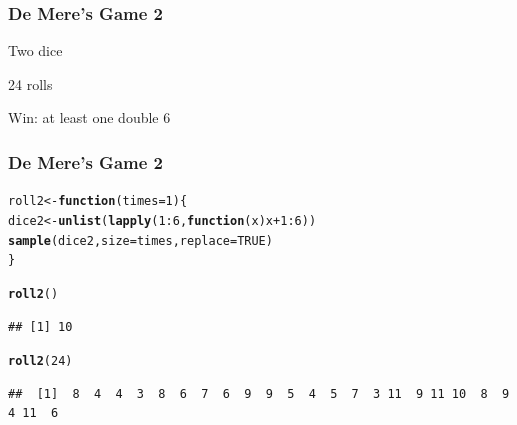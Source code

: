 \documentclass[12pt]{beamer}\usepackage[]{graphicx}\usepackage[]{color}
\makeatletter
\newcommand{\hlnum}[1]{\textcolor[rgb]{0.686,0.059,0.569}{#1}}%
\newcommand{\hlopt}[1]{\textcolor[rgb]{0,0,0}{#1}}%
\newcommand{\hlstd}[1]{\textcolor[rgb]{0.345,0.345,0.345}{#1}}%
\newcommand{\hlkwa}[1]{\textcolor[rgb]{0.161,0.373,0.58}{\textbf{#1}}}%
\newcommand{\hlkwb}[1]{\textcolor[rgb]{0.69,0.353,0.396}{#1}}%
\newcommand{\hlkwc}[1]{\textcolor[rgb]{0.333,0.667,0.333}{#1}}%
\newcommand{\hlkwd}[1]{\textcolor[rgb]{0.737,0.353,0.396}{\textbf{#1}}}%
\newenvironment{kframe}{%
 \def\at@end@of@kframe{}%
 \ifinner\ifhmode%
  \def\at@end@of@kframe{\end{minipage}}%
  \begin{minipage}{\columnwidth}%
 \fi\fi%
 \def\FrameCommand##1{\hskip\@totalleftmargin \hskip-\fboxsep
 \colorbox{shadecolor}{##1}\hskip-\fboxsep
     \hskip-\linewidth \hskip-\@totalleftmargin \hskip\columnwidth}%
 \MakeFramed {\advance\hsize-\width
   \@totalleftmargin\z@ \linewidth\hsize
   \@setminipage}}%
 {\par\unskip\endMakeFramed%
 \at@end@of@kframe}
\newenvironment{knitrout}{}{} %
\makeatother
\begin{document}

\begin{frame}
\begin{center}
\Huge{}
\end{center}
\end{frame}


\begin{frame}[fragile]
\frametitle{De Mere's Game 2}

\bi
  \item Two dice
  \item 24 rolls
  \item Win: at least one double 6
\ei
\eb

\end{frame}


\begin{frame}[fragile]
\frametitle{De Mere's Game 2}

\begin{knitrout}\footnotesize
{}\color{fgcolor}\begin{kframe}
\begin{alltt}
\hlstd{roll2} \hlkwb{<-} \hlkwa{function}\hlstd{(}\hlkwc{times} \hlstd{=} \hlnum{1}\hlstd{) \{}
  \hlstd{dice2} \hlkwb{<-} \hlkwd{unlist}\hlstd{(}\hlkwd{lapply}\hlstd{(}\hlnum{1}\hlopt{:}\hlnum{6}\hlstd{,} \hlkwa{function}\hlstd{(}\hlkwc{x}\hlstd{) x} \hlopt{+} \hlnum{1}\hlopt{:}\hlnum{6}\hlstd{))}
  \hlkwd{sample}\hlstd{(dice2,} \hlkwc{size} \hlstd{= times,} \hlkwc{replace} \hlstd{=} \hlnum{TRUE}\hlstd{)}
\hlstd{\}}

\hlkwd{roll2}\hlstd{()}
\end{alltt}
\begin{verbatim}
## [1] 10
\end{verbatim}
\begin{alltt}
\hlkwd{roll2}\hlstd{(}\hlnum{24}\hlstd{)}
\end{alltt}
\begin{verbatim}
##  [1]  8  4  4  3  8  6  7  6  9  9  5  4  5  7  3 11  9 11 10  8  9  4 11  6
\end{verbatim}
\end{kframe}
\end{knitrout}
\end{frame}
\end{document}
